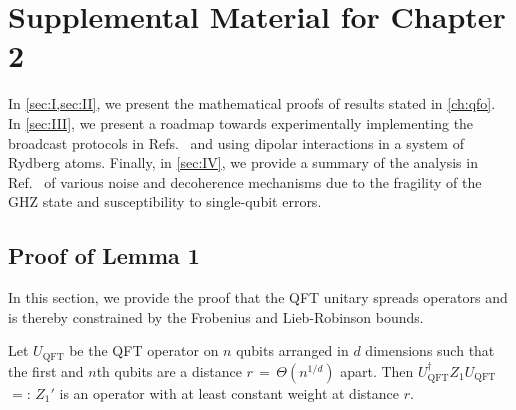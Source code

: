 \chapter{Supplemental Material for Chapter 2}

In \cref{sec:I,sec:II}, we present the mathematical proofs of results stated in \cref{ch:qfo}.
In \cref{sec:III}, we present a roadmap towards experimentally implementing the broadcast protocols in Refs.~\cite{Eldredge2017} and \cite{Tran2021a} using dipolar interactions in a system of Rydberg atoms.
Finally, in \cref{sec:IV}, we provide a summary of the analysis in Ref.~\cite{Eldredge2017} of various noise and decoherence mechanisms due to the fragility of the GHZ state and susceptibility to single-qubit errors.

\section{Proof of Lemma 1}
\label{sec:I}
In this section, we provide the proof that the QFT unitary spreads operators and is thereby constrained by the Frobenius and Lieb-Robinson bounds.

\begin{lemma} \label{lem_qft_weight}
Let $U_\mathrm{QFT}$ be the QFT operator on $n$ qubits arranged in $d$ dimensions such that the first and $n$th qubits are a distance $r$\,$=$\,$\Theta(n^{1/d})$ apart.
Then $U_\mathrm{QFT}^\dag Z_1 U_\mathrm{QFT}$\,$=:$\,$Z_1' $ is an operator with at least constant weight at distance $r$.
\end{lemma}

